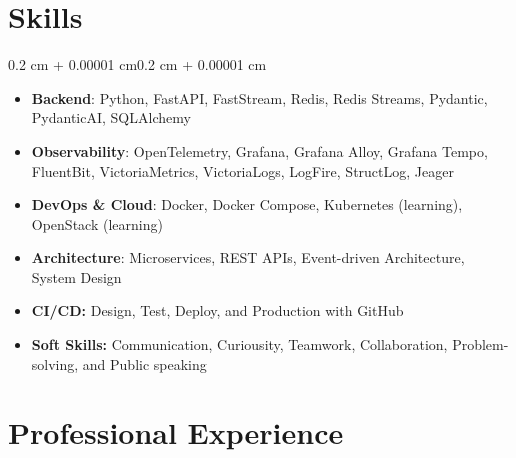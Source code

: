 \documentclass[10pt, letterpaper]{article}
\newenvironment{highlightsforbulletentries}{
    \begin{itemize}[
        topsep=0.10 cm,
        parsep=0.10 cm,
        partopsep=0pt,
        itemsep=0pt,
        leftmargin=10pt
    ]
}{
    \end{itemize}
}
\newenvironment{onecolentry}{
    \begin{adjustwidth}{0.2 cm + 0.00001 cm}{0.2 cm + 0.00001 cm}
}{
    \end{adjustwidth}
}
\begin{document}
\section{Skills}
\begin{onecolentry}
\begin{highlightsforbulletentries}
\item
\textbf{Backend}: Python, FastAPI, FastStream, Redis, Redis Streams, Pydantic, PydanticAI, SQLAlchemy

\item
\textbf{Observability}: OpenTelemetry, Grafana, Grafana Alloy, Grafana Tempo, FluentBit, VictoriaMetrics, VictoriaLogs,  LogFire, StructLog, Jeager

\item
\textbf{DevOps \& Cloud}: Docker, Docker Compose, Kubernetes (learning), OpenStack (learning)

\item
\textbf{Architecture}: Microservices, REST APIs, Event-driven Architecture, System Design

\item
\textbf{CI/CD:} Design, Test, Deploy, and Production with GitHub

\item
\textbf{Soft Skills:} Communication, Curiousity, Teamwork, Collaboration, Problem-solving, and Public speaking
\end{highlightsforbulletentries}
\end{onecolentry}

\section{Professional Experience}
\end{document}
